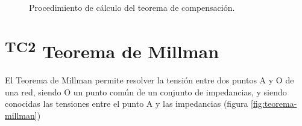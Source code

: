 \begin{figure}[H]
  \centering
  \hspace{1cm}
  \hspace{1cm}
  \caption{Procedimiento de cálculo del teorema de compensación.}
  \label{fig:teorema-compensacion-procedimiento}
\end{figure}



\section{\textsuperscript{TC2} Teorema de Millman}
\label{sec:teorema-millman}


El Teorema de Millman permite resolver la tensión entre dos puntos A y O de una red, siendo O un punto común de un conjunto de impedancias, y siendo conocidas las tensiones entre el punto A y las impedancias (figura \ref{fig:teorema-millman})

